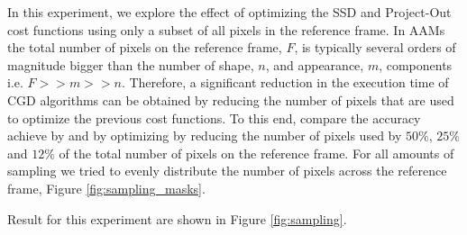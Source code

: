 In this experiment, we explore the effect of optimizing the SSD and Project-Out cost functions using only a subset of all pixels in the reference frame. In AAMs the total number of pixels on the reference frame, $F$, is typically several orders of magnitude bigger than the number of shape, $n$, and appearance, $m$, components i.e. $F>>m>>n$. Therefore, a significant reduction in the execution time of CGD algorithms can be obtained by reducing the number of pixels that are used to optimize the previous cost functions. To this end, compare the accuracy achieve by and by optimizing by reducing the number of pixels used by $50\%$, $25\%$ and $12\%$ of the total number of pixels on the reference frame. For all amounts of sampling we tried to evenly distribute the number of pixels across the reference frame, Figure \ref{fig:sampling_masks}.

Result for this experiment are shown in Figure \ref{fig:sampling}.

